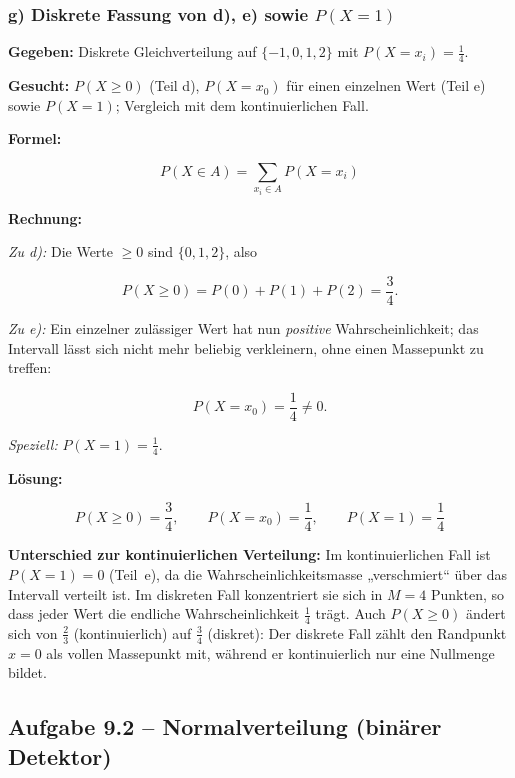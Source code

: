 \subsubsection*{g) Diskrete Fassung von d), e) sowie $P(X = 1)$}

\begin{beispiel}

\textbf{Gegeben:} Diskrete Gleichverteilung auf $\{-1, 0, 1, 2\}$ mit
$P(X = x_i) = \tfrac14$.

\textbf{Gesucht:} $P(X \geq 0)$ (Teil d), $P(X = x_0)$ für einen einzelnen Wert
(Teil e) sowie $P(X = 1)$; Vergleich mit dem kontinuierlichen Fall.

\textbf{Formel:}

$$
P(X \in A) = \sum_{x_i \in A} P(X = x_i)
$$

\textbf{Rechnung:}

\emph{Zu d):} Die Werte $\geq 0$ sind $\{0, 1, 2\}$, also

$$
P(X \geq 0) = P(0) + P(1) + P(2) = \frac{3}{4}.
$$

\emph{Zu e):} Ein einzelner zulässiger Wert hat nun \emph{positive}
Wahrscheinlichkeit; das Intervall lässt sich nicht mehr beliebig verkleinern,
ohne einen Massepunkt zu treffen:

$$
P(X = x_0) = \frac{1}{4} \neq 0.
$$

\emph{Speziell:} $\displaystyle P(X = 1) = \frac{1}{4}$.

\textbf{Lösung:}

$$
\boxed{\;P(X \geq 0) = \frac{3}{4}, \qquad P(X = x_0) = \frac{1}{4}, \qquad
P(X = 1) = \frac{1}{4}\;}
$$

\textbf{Unterschied zur kontinuierlichen Verteilung:} Im kontinuierlichen Fall
ist $P(X = 1) = 0$ (Teil~e), da die Wahrscheinlichkeitsmasse „verschmiert`` über
das Intervall verteilt ist. Im diskreten Fall konzentriert sie sich in
$M = 4$ Punkten, so dass jeder Wert die endliche Wahrscheinlichkeit $\tfrac14$
trägt. Auch $P(X \geq 0)$ ändert sich von $\tfrac23$ (kontinuierlich) auf
$\tfrac34$ (diskret): Der diskrete Fall zählt den Randpunkt $x = 0$ als vollen
Massepunkt mit, während er kontinuierlich nur eine Nullmenge bildet.

\end{beispiel}

\subsection*{Aufgabe 9.2 – Normalverteilung (binärer Detektor)}

